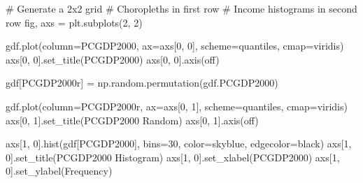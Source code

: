 \documentclass[
  a4paper, 
  twoside,
  final
]{article}
\newenvironment{Shaded}{\begin{snugshade}}{\end{snugshade}}
\newcommand{\CommentTok}[1]{\textcolor[rgb]{0.37,0.37,0.37}{#1}}
\newcommand{\DecValTok}[1]{\textcolor[rgb]{0.68,0.00,0.00}{#1}}
\newcommand{\NormalTok}[1]{\textcolor[rgb]{0.00,0.23,0.31}{#1}}
\newcommand{\OperatorTok}[1]{\textcolor[rgb]{0.37,0.37,0.37}{#1}}
\newcommand{\StringTok}[1]{\textcolor[rgb]{0.13,0.47,0.30}{#1}}
\begin{document}
\begin{Shaded}
\begin{Highlighting}[]
\CommentTok{\# Generate a 2x2 grid}
\CommentTok{\# Choropleths in first row}
\CommentTok{\# Income histograms in second row}
\NormalTok{fig, axs }\OperatorTok{=}\NormalTok{ plt.subplots(}\DecValTok{2}\NormalTok{, }\DecValTok{2}\NormalTok{)}

\NormalTok{gdf.plot(column}\OperatorTok{=}\StringTok{\textquotesingle{}PCGDP2000\textquotesingle{}}\NormalTok{, ax}\OperatorTok{=}\NormalTok{axs[}\DecValTok{0}\NormalTok{, }\DecValTok{0}\NormalTok{], scheme}\OperatorTok{=}\StringTok{\textquotesingle{}quantiles\textquotesingle{}}\NormalTok{,}
\NormalTok{         cmap}\OperatorTok{=}\StringTok{\textquotesingle{}viridis\textquotesingle{}}\NormalTok{)}
\NormalTok{axs[}\DecValTok{0}\NormalTok{, }\DecValTok{0}\NormalTok{].set\_title(}\StringTok{\textquotesingle{}PCGDP2000\textquotesingle{}}\NormalTok{)}
\NormalTok{axs[}\DecValTok{0}\NormalTok{, }\DecValTok{0}\NormalTok{].axis(}\StringTok{\textquotesingle{}off\textquotesingle{}}\NormalTok{)}


\NormalTok{gdf[}\StringTok{\textquotesingle{}PCGDP2000r\textquotesingle{}}\NormalTok{] }\OperatorTok{=}\NormalTok{ np.random.permutation(gdf.PCGDP2000)}

\NormalTok{gdf.plot(column}\OperatorTok{=}\StringTok{\textquotesingle{}PCGDP2000r\textquotesingle{}}\NormalTok{, ax}\OperatorTok{=}\NormalTok{axs[}\DecValTok{0}\NormalTok{, }\DecValTok{1}\NormalTok{], scheme}\OperatorTok{=}\StringTok{\textquotesingle{}quantiles\textquotesingle{}}\NormalTok{,}
\NormalTok{         cmap}\OperatorTok{=}\StringTok{\textquotesingle{}viridis\textquotesingle{}}\NormalTok{)}
\NormalTok{axs[}\DecValTok{0}\NormalTok{, }\DecValTok{1}\NormalTok{].set\_title(}\StringTok{\textquotesingle{}PCGDP2000 Random\textquotesingle{}}\NormalTok{)}
\NormalTok{axs[}\DecValTok{0}\NormalTok{, }\DecValTok{1}\NormalTok{].axis(}\StringTok{\textquotesingle{}off\textquotesingle{}}\NormalTok{)}

\NormalTok{axs[}\DecValTok{1}\NormalTok{, }\DecValTok{0}\NormalTok{].hist(gdf[}\StringTok{\textquotesingle{}PCGDP2000\textquotesingle{}}\NormalTok{], bins}\OperatorTok{=}\DecValTok{30}\NormalTok{, color}\OperatorTok{=}\StringTok{\textquotesingle{}skyblue\textquotesingle{}}\NormalTok{,}
\NormalTok{               edgecolor}\OperatorTok{=}\StringTok{\textquotesingle{}black\textquotesingle{}}\NormalTok{)}
\NormalTok{axs[}\DecValTok{1}\NormalTok{, }\DecValTok{0}\NormalTok{].set\_title(}\StringTok{\textquotesingle{}PCGDP2000 Histogram\textquotesingle{}}\NormalTok{)}
\NormalTok{axs[}\DecValTok{1}\NormalTok{, }\DecValTok{0}\NormalTok{].set\_xlabel(}\StringTok{\textquotesingle{}PCGDP2000\textquotesingle{}}\NormalTok{)}
\NormalTok{axs[}\DecValTok{1}\NormalTok{, }\DecValTok{0}\NormalTok{].set\_ylabel(}\StringTok{\textquotesingle{}Frequency\textquotesingle{}}\NormalTok{)}


\end{Highlighting}
\end{Shaded}
\end{document}
